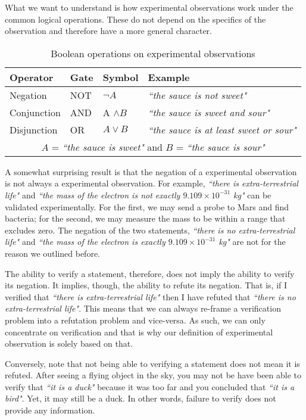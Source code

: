 \documentclass[11pt,letterpaper,fleqn]{memoir} %
\begin{document}
What we want to understand is how experimental observations work under the common logical operations. These do not depend on the specifics of the observation and therefore have a more general character.
\begin{table}[h]
	\centering
	\begin{tabular}{p{} p{} p{} p{}}
		Operator & Gate & Symbol & Example \\ 
		\hline 
		Negation & NOT & $\neg A$ &  \emph{``the sauce is not sweet"} \\ 
		Conjunction & AND & A $\wedge B$ & \emph{``the sauce is sweet and sour"} \\ 
		Disjunction & OR & $A \vee B$ & \emph{``the sauce is at least sweet or sour"}\\
		\multicolumn{4}{c}{  $A$ = \emph{``the sauce is sweet"} and $B$ = \emph{``the sauce is sour"}}
	\end{tabular} 
	\caption{Boolean operations on experimental observations}
\end{table}

A somewhat surprising result is that the negation of a experimental observation is not always a experimental observation. For example, \emph{``there is extra-terrestrial life"} and \emph{``the mass of the electron is not exactly $9.109 \times 10^{-31}$ kg"} can be validated experimentally. For the first, we may send a probe to Mars and find bacteria; for the second, we may measure the mass to be within a range that excludes zero. The negation of the two statements,  \emph{``there is no extra-terrestrial life"} and \emph{``the mass of the electron is exactly $9.109 \times 10^{-31}$ kg"} are not for the reason we outlined before.

The ability to verify a statement, therefore, does not imply the ability to verify its negation. It implies, though, the ability to refute its negation. That is, if I verified that \emph{``there is extra-terrestrial life"} then I have refuted that \emph{``there is no extra-terrestrial life"}. This means that we can always re-frame a verification problem into a refutation problem and vice-versa. As such, we can only concentrate on verification and that is why our definition of experimental observation is solely based on that.

Conversely, note that not being able to verifying a statement does not mean it is refuted. After seeing a flying object in the sky, you may not be have been able to verify that \emph{``it is a duck"} because it was too far and you concluded that \emph{``it is a bird"}. Yet, it may still be a duck. In other words, failure to verify does not provide any information.
\end{document}
